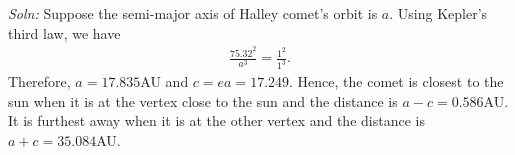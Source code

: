 \documentclass{article}
\begin{document}
\begin{enumerate}
  \emph{Soln:} Suppose the semi-major axis of Halley comet's orbit is $a$. Using Kepler's third law, we have
\begin{align*}
  \frac{75.32^2}{a^3} = \frac{1^2}{1^3}.
\end{align*}
Therefore, $a = 17.835$AU and $c = ea = 17.249$. Hence, the comet is closest to the sun when it is at the vertex close to the sun and the distance is $a-c = 0.586$AU. It is furthest away when it is at the other vertex and the distance is $a+c = 35.084$AU.

\end{enumerate}
\end{document}

